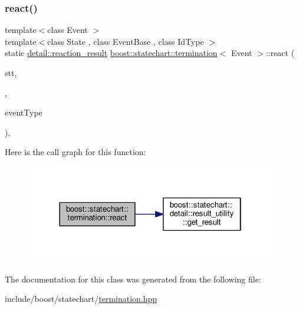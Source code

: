 \subsubsection{\texorpdfstring{react()}{react()}}
{\footnotesize\ttfamily template$<$class Event $>$ \\
template$<$class State , class Event\+Base , class Id\+Type $>$ \\
static \mbox{\hyperlink{namespaceboost_1_1statechart_1_1detail_ab091bbb4c29327fb46ee479ea1b7255b}{detail\+::reaction\+\_\+result}} \mbox{\hyperlink{classboost_1_1statechart_1_1termination}{boost\+::statechart\+::termination}}$<$ Event $>$\+::react (\begin{DoxyParamCaption}\item[{State \&}]{stt,  }\item[{const Event\+Base \&}]{,  }\item[{const Id\+Type \&}]{event\+Type }\end{DoxyParamCaption})\hspace{0.3cm}{\ttfamily [inline]}, {\ttfamily [static]}}

Here is the call graph for this function\+:
\nopagebreak
\begin{figure}[H]
\begin{center}
\leavevmode
\includegraphics[width=310pt]{classboost_1_1statechart_1_1termination_a88533f0d39b8fdfa3d83b7217b55f345_cgraph}
\end{center}
\end{figure}


The documentation for this class was generated from the following file\+:\begin{DoxyCompactItemize}
\item 
include/boost/statechart/\mbox{\hyperlink{termination_8hpp}{termination.\+hpp}}\end{DoxyCompactItemize}
